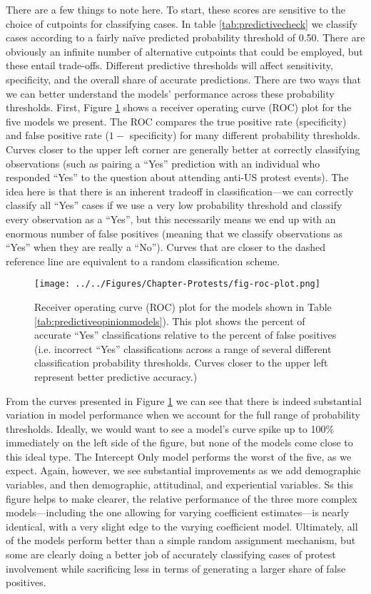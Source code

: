 There are a few things to note here. To start, these scores are sensitive to the choice of cutpoints for classifying cases. In table \ref{tab:predictivecheck} we classify cases according to a fairly na\"{i}ve predicted probability threshold of 0.50. There are obviously an infinite number of alternative cutpoints that could be employed, but these entail trade-offs. Different predictive thresholds will affect sensitivity, specificity, and the overall share of accurate predictions. There are two ways that we can better understand the models' performance across these probability thresholds. First, Figure \ref{fig:protest-roc-plot} shows a receiver operating curve (ROC) plot for the five models we present. The ROC compares the true positive rate (specificity) and false positive rate ($1-$ specificity) for many different probability thresholds. Curves closer to the upper left corner are generally better at correctly classifying observations (such as pairing a ``Yes'' prediction with an individual who responded ``Yes'' to the question about attending anti-US protest events). The idea here is that there is an inherent tradeoff in classification---we can correctly classify all ``Yes'' cases if we use a very low probability threshold and classify every observation as a ``Yes'', but this necessarily means we end up with an enormous number of false positives (meaning that we classify observations as ``Yes'' when they are really a ``No''). Curves that are closer to the dashed reference line are equivalent to a random classification scheme.


\begin{figure}[t]
	\centering\texttt{[image: ../../Figures/Chapter-Protests/fig-roc-plot.png]}
	\caption{Receiver operating curve (ROC) plot for the models shown in Table \ref{tab:predictiveopinionmodels}). This plot shows the percent of accurate ``Yes'' classifications relative to the percent of false positives (i.e. incorrect ``Yes'' classifications across a range of several different classification probability thresholds. Curves closer to the upper left represent better predictive accuracy.)}
	\label{fig:protest-roc-plot}
\end{figure}

From the curves presented in Figure \ref{fig:protest-roc-plot} we can see that there is indeed substantial variation in model performance when we account for the full range of probability thresholds. Ideally, we would want to see a model's curve spike up to 100\% immediately on the left side of the figure, but none of the models come close to this ideal type. The Intercept Only model performs the worst of the five, as we expect. Again, however, we see substantial improvements as we add demographic variables, and then demographic, attitudinal, and experiential variables. Ss this figure helps to make clearer, the relative performance of the three more complex models---including the one allowing for varying coefficient estimates---is nearly identical, with a very slight edge to the varying coefficient model. Ultimately, all of the models perform better than a simple random assignment mechanism, but some are clearly doing a better job of accurately classifying cases of protest involvement while sacrificing less in terms of generating a larger share of false positives.

